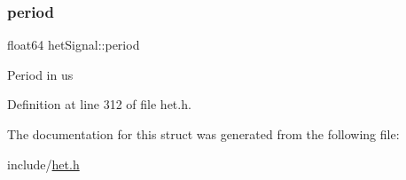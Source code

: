 \subsubsection{\texorpdfstring{period}{period}}
{\footnotesize\ttfamily float64 het\+Signal\+::period}

Period in us 

Definition at line 312 of file het.\+h.



The documentation for this struct was generated from the following file\+:\begin{DoxyCompactItemize}
\item 
include/\mbox{\hyperlink{het_8h}{het.\+h}}\end{DoxyCompactItemize}
